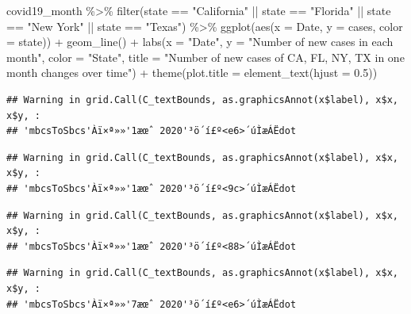 \documentclass[
]{book}
\newenvironment{Shaded}{\begin{snugshade}}{\end{snugshade}}
\newcommand{\AttributeTok}[1]{\textcolor[rgb]{0.77,0.63,0.00}{#1}}
\newcommand{\FloatTok}[1]{\textcolor[rgb]{0.00,0.00,0.81}{#1}}
\newcommand{\FunctionTok}[1]{\textcolor[rgb]{0.00,0.00,0.00}{#1}}
\newcommand{\NormalTok}[1]{#1}
\newcommand{\SpecialCharTok}[1]{\textcolor[rgb]{0.00,0.00,0.00}{#1}}
\newcommand{\StringTok}[1]{\textcolor[rgb]{0.31,0.60,0.02}{#1}}
\begin{document}
\begin{Shaded}
\begin{Highlighting}[]
\NormalTok{covid19\_month }\SpecialCharTok{\%\textgreater{}\%}
  \FunctionTok{filter}\NormalTok{(state }\SpecialCharTok{==} \StringTok{"California"} \SpecialCharTok{||}\NormalTok{ state }\SpecialCharTok{==} \StringTok{"Florida"} \SpecialCharTok{||}\NormalTok{ state }\SpecialCharTok{==} \StringTok{"New York"} \SpecialCharTok{||}\NormalTok{ state }\SpecialCharTok{==} \StringTok{"Texas"}\NormalTok{) }\SpecialCharTok{\%\textgreater{}\%}
  \FunctionTok{ggplot}\NormalTok{(}\FunctionTok{aes}\NormalTok{(}\AttributeTok{x =}\NormalTok{ Date, }\AttributeTok{y =}\NormalTok{ cases, }\AttributeTok{color =}\NormalTok{ state)) }\SpecialCharTok{+}
  \FunctionTok{geom\_line}\NormalTok{() }\SpecialCharTok{+}
  \FunctionTok{labs}\NormalTok{(}\AttributeTok{x =} \StringTok{"Date"}\NormalTok{, }\AttributeTok{y =} \StringTok{"Number of new cases in each month"}\NormalTok{, }\AttributeTok{color =} \StringTok{"State"}\NormalTok{, }\AttributeTok{title =} \StringTok{"Number of new cases of CA, FL, NY, TX in one month changes over time"}\NormalTok{) }\SpecialCharTok{+}
  \FunctionTok{theme}\NormalTok{(}\AttributeTok{plot.title =} \FunctionTok{element\_text}\NormalTok{(}\AttributeTok{hjust =} \FloatTok{0.5}\NormalTok{))}
\end{Highlighting}
\end{Shaded}

\begin{verbatim}
## Warning in grid.Call(C_textBounds, as.graphicsAnnot(x$label), x$x, x$y, :
## 'mbcsToSbcs'Àï×ª»»'1æœˆ 2020'³ö´í£º<e6>´úÌæÁËdot
\end{verbatim}

\begin{verbatim}
## Warning in grid.Call(C_textBounds, as.graphicsAnnot(x$label), x$x, x$y, :
## 'mbcsToSbcs'Àï×ª»»'1æœˆ 2020'³ö´í£º<9c>´úÌæÁËdot
\end{verbatim}

\begin{verbatim}
## Warning in grid.Call(C_textBounds, as.graphicsAnnot(x$label), x$x, x$y, :
## 'mbcsToSbcs'Àï×ª»»'1æœˆ 2020'³ö´í£º<88>´úÌæÁËdot
\end{verbatim}

\begin{verbatim}
## Warning in grid.Call(C_textBounds, as.graphicsAnnot(x$label), x$x, x$y, :
## 'mbcsToSbcs'Àï×ª»»'7æœˆ 2020'³ö´í£º<e6>´úÌæÁËdot
\end{verbatim}
\end{document}
